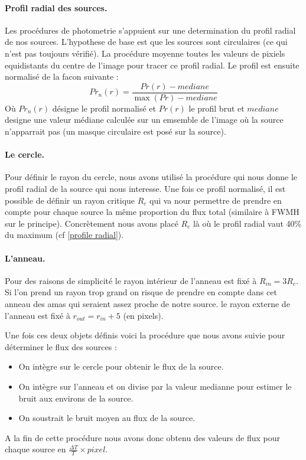 \documentclass[a4paper,11pt]{article}
\begin{document}
\paragraph{Profil radial des sources.} Les procédures de photometrie s'appuient sur une determination 
du profil radial de nos sources. L'hypothese de base est que les sources sont circulaires (ce qui n'est 
pas toujours vérifié). La procédure moyenne toutes les valeurs de pixiels equidistants du centre de l'image
pour tracer ce profil radial. Le profil est ensuite normalisé de la facon suivante  : 
\begin{equation}
Pr_n(r) = \frac{Pr(r) - mediane}{\max ( Pr) - mediane}
\end{equation} 
Où $Pr_n(r)$ désigne le profil normalisé et $Pr(r)$ le profil brut et $mediane$ designe une valeur médiane
calculée sur un emsemble de l'image où la source n'apparrait pas (un masque circulaire est posé sur la source).\\

\paragraph{Le cercle.} Pour définir le rayon du cercle, nous avons utilisé la procédure qui nous donne le
profil radial de la source qui nous interesse. Une fois ce profil normalisé, il est possible de définir un rayon critique
$R_c$ qui va nour permettre de prendre en compte pour chaque source la même proportion du flux total
(similaire à FWMH sur le principe). Concrètement nous avons placé $R_c$ là où le profil radial vaut 40\% du maximum
(cf \ref{profile radial}). \\ 

\paragraph{L'anneau.} Pour des raisons de simplicité le rayon intérieur de l'anneau 
est fixé à $R_{in} = 3R_c $. Si l'on prend un rayon trop grand on risque de prendre en compte dans cet
anneau des amas qui seraient assez proche de notre source.  le rayon externe de l'anneau est fixé à 
$r_{out} = r_{in} + 5  $ (en pixels).

Une fois ces deux objets définis voici la procédure que nous avons suivie pour déterminer le
flux des sources : 
\begin{itemize}
\item On intègre sur le cercle pour obtenir le flux de la source.
\item On intègre sur l'anneau et on divise par la valeur medianne pour estimer le bruit 
aux environs de la source.
\item On soustrait le bruit moyen  au flux de la source.
\end{itemize}
A la fin de cette procédure nous avons donc obtenu des valeurs de flux pour chaque source en 
$\frac{\Delta T}{T}\times pixel $.
\end{document}
